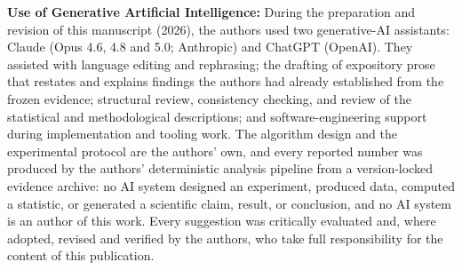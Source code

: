 \documentclass[algorithms,article,submit,moreauthors,pdftex]{Definitions/mdpi}
\begin{document}
%
%
\vspace{1em}
\noindent\textbf{Use of Generative Artificial Intelligence:}\quad
During the preparation and revision of this manuscript (2026), the authors used
two generative-AI assistants: Claude (Opus 4.6, 4.8 and 5.0; Anthropic) and
ChatGPT (OpenAI). They assisted with language editing and rephrasing; the
drafting of expository prose that restates and explains findings the authors had
already established from the frozen evidence; structural review, consistency
checking, and review of the statistical and methodological descriptions; and
software-engineering support during implementation and tooling work. The
algorithm design and the experimental protocol are the authors' own, and every
reported number was produced by the authors' deterministic analysis pipeline
from a version-locked evidence archive: no AI system designed an experiment,
produced data, computed a statistic, or generated a scientific claim, result, or
conclusion, and no AI system is an author of this work. Every suggestion was
critically evaluated and, where adopted, revised and verified by the authors,
who take full responsibility for the content of this publication.
\end{document}

